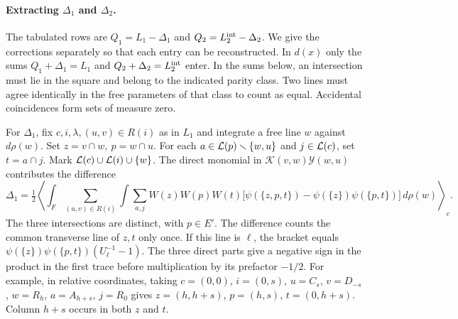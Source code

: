 \paragraph{Extracting \(\Delta_1\) and \(\Delta_2\).} The tabulated rows are \(Q_1=L_1-\Delta_1\) and
\(Q_2=L_2^{\rm int}-\Delta_2\). We give the corrections separately so that each entry can be
reconstructed. In \(d(x)\) only the sums \(Q_1+\Delta_1=L_1\) and \(Q_2+\Delta_2=L_2^{\rm int}\) enter.
In the sums below, an intersection must lie in the square and belong to the indicated
parity class. Two lines must agree identically in the free parameters of that class to count as equal.
Accidental coincidences form sets of measure zero.

For \(\Delta_1\), fix \(c,i,\lambda,(u,v)\in R(i)\) as in \(L_1\) and integrate a free line \(w\) against
\(d\rho(w)\). Set \(z=v\cap w,\ p=w\cap u\). For each \(a\in \mathcal L(p)\smallsetminus\{w,u\}\) and \(j\in
\mathcal L(c)\), set \(t=a\cap j\). Mark \(\mathcal L(c)\cup \mathcal L(i)\cup\{w\}\). The direct monomial
in \(\mathcal K(v,w)\mathcal Y(w,u)\) contributes the difference \[
 \Delta_1=\tfrac12\left\langle\int_F\sum_{(u,v)\in R(i)}
 \int\sum_{a,j} W(z)W(p)W(t)
 \big[\psi(\{z,p,t\})-\psi(\{z\})\psi(\{p,t\})\big]\,d\rho(w)\right\rangle_c .
\] The three intersections are distinct, with \(p\in E'\). The difference counts the common transverse
line of \(z,t\) only once. If this line is \(\ell\), the bracket equals
\(\psi(\{z\})\psi(\{p,t\})(U_\ell^{-1}-1)\). The three direct parts give a negative sign in the product
in the first trace before multiplication by its prefactor \(-1/2\). For example, in relative coordinates,
taking \(c=(0,0)\), \(i=(0,s)\), \(u=C_s\), \(v=D_{-s}\), \(w=R_h\), \(a=A_{h+s}\), \(j=R_0\) gives
\(z=(h,h+s)\), \(p=(h,s)\), \(t=(0,h+s)\). Column \(h+s\) occurs in both \(z\) and \(t\).

